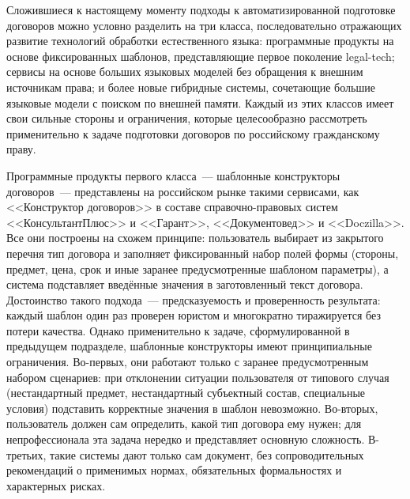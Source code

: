 Сложившиеся к настоящему моменту подходы к автоматизированной подготовке договоров можно условно разделить на три класса, последовательно отражающих развитие технологий обработки естественного языка: программные продукты на основе фиксированных шаблонов, представляющие первое поколение legal-tech; сервисы на основе больших языковых моделей без обращения к внешним источникам права; и более новые гибридные системы, сочетающие большие языковые модели с поиском по внешней памяти. Каждый из этих классов имеет свои сильные стороны и ограничения, которые целесообразно рассмотреть применительно к задаче подготовки договоров по российскому гражданскому праву.

Программные продукты первого класса~--- шаблонные конструкторы договоров~--- представлены на российском рынке такими сервисами, как <<Конструктор договоров>> в составе справочно-правовых систем <<КонсультантПлюс>> и <<Гарант>>, <<Документовед>> и <<Doczilla>>. Все они построены на схожем принципе: пользователь выбирает из закрытого перечня тип договора и заполняет фиксированный набор полей формы (стороны, предмет, цена, срок и иные заранее предусмотренные шаблоном параметры), а система подставляет введённые значения в заготовленный текст договора. Достоинство такого подхода~--- предсказуемость и проверенность результата: каждый шаблон один раз проверен юристом и многократно тиражируется без потери качества. Однако применительно к задаче, сформулированной в предыдущем подразделе, шаблонные конструкторы имеют принципиальные ограничения. Во-первых, они работают только с заранее предусмотренным набором сценариев: при отклонении ситуации пользователя от типового случая (нестандартный предмет, нестандартный субъектный состав, специальные условия) подставить корректные значения в шаблон невозможно. Во-вторых, пользователь должен сам определить, какой тип договора ему нужен; для непрофессионала эта задача нередко и представляет основную сложность. В-третьих, такие системы дают только сам документ, без сопроводительных рекомендаций о применимых нормах, обязательных формальностях и характерных рисках.


